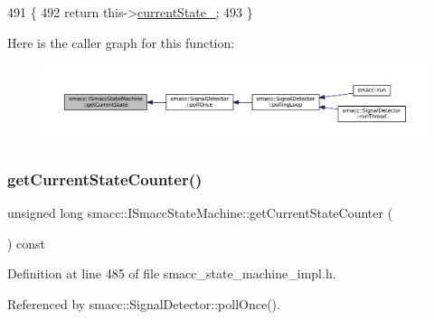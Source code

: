 \begin{DoxyCode}
491 \{
492   \textcolor{keywordflow}{return} this->\hyperlink{classsmacc_1_1ISmaccStateMachine_a9c6e7745205bcce80a301f2fbe8f7e99}{currentState\_};
493 \}
\end{DoxyCode}
Here is the caller graph for this function\+:
\nopagebreak
\begin{figure}[H]
\begin{center}
\leavevmode
\includegraphics[width=350pt]{classsmacc_1_1ISmaccStateMachine_a610d09dc5341fb63732be713c21fbe86_icgraph}
\end{center}
\end{figure}
\mbox{\label{classsmacc_1_1ISmaccStateMachine_aad27c0182b53245d0aded22e63cd83bd}} 
\subsubsection{\texorpdfstring{get\+Current\+State\+Counter()}{getCurrentStateCounter()}}
{\footnotesize\ttfamily unsigned long smacc\+::\+I\+Smacc\+State\+Machine\+::get\+Current\+State\+Counter (\begin{DoxyParamCaption}{ }\end{DoxyParamCaption}) const\hspace{0.3cm}{\ttfamily [inline]}}



Definition at line 485 of file smacc\+\_\+state\+\_\+machine\+\_\+impl.\+h.



Referenced by smacc\+::\+Signal\+Detector\+::poll\+Once().



